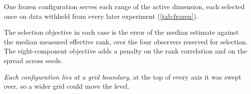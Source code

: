 \documentclass[twoside]{article}
\begin{document}
One frozen configuration serves each range of the active dimension, each selected once on data
withheld from every later experiment (\cref{tab:frozen}).

\begin{table}[H]
\centering
\caption{The frozen configurations and their selection. Only the swept parameters were varied; the
remainder were fixed before any estimate was computed. Settings common to both configurations are
not repeated: $m = 20$ neighbours, a Theiler exclusion of at least the embedding span
(\cref{app:alg}). The neighbour count and the exclusion were swept in
the eight-component grid, in which the two Theiler rules return bit-identical values, so the
selection between them is arbitrary.}
\label{tab:frozen}
\end{table}

The selection objective in each case is the error of the median estimate against the median
measured effective rank, over the four observers reserved for selection. The eight-component
objective adds a penalty on the rank correlation and on the spread
across seeds.

\emph{Each configuration lies at a grid boundary}, at the top of every axis it was swept over, so a
wider grid could move the level.
\end{document}

